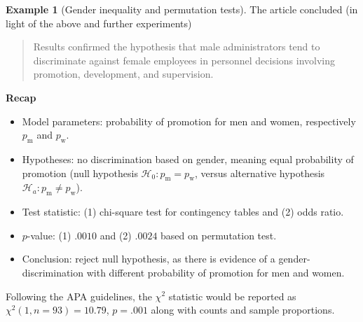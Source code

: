 \documentclass[
  11pt,
  letterpaper,
]{scrbook}
\providecommand{\tightlist}{%
  \setlength{\itemsep}{0pt}\setlength{\parskip}{0pt}}\usepackage{longtable,booktabs,array}
\theoremstyle{definition}
\theoremstyle{definition}
\newtheorem{example}{Example}[chapter]
\theoremstyle{remark}
\begin{document}
\begin{example}[Gender inequality and permutation
tests]
The article concluded (in light of the above and further experiments)

\begin{quote}
Results confirmed the hypothesis that male administrators tend to
discriminate against female employees in personnel decisions involving
promotion, development, and supervision.
\end{quote}

\textbf{Recap}

\begin{itemize}
\tightlist
\item
  Model parameters: probability of promotion for men and women,
  respectively \(p_{\text{m}}\) and \(p_{\text{w}}\).
\item
  Hypotheses: no discrimination based on gender, meaning equal
  probability of promotion (null hypothesis
  \(\mathscr{H}_0: p_{\text{m}}=p_{\text{w}}\), versus alternative
  hypothesis \(\mathscr{H}_a: p_{\text{m}}\neq p_{\text{w}}\)).
\item
  Test statistic: (1) chi-square test for contingency tables and (2)
  odds ratio.
\item
  \(p\)-value: (1) \(.0010\) and (2) \(.0024\) based on permutation
  test.
\item
  Conclusion: reject null hypothesis, as there is evidence of a
  gender-discrimination with different probability of promotion for men
  and women.
\end{itemize}

Following the APA guidelines, the \(\chi^2\) statistic would be reported
as \(\chi^2(1, n = 93) = 10.79\), \(p = .001\) along with counts and
sample proportions.

\end{example}
\end{document}
